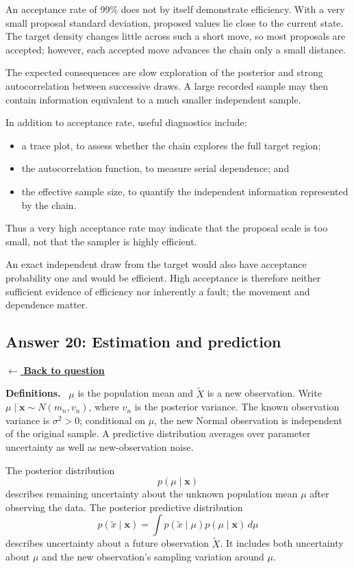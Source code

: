 \documentclass[11pt,a4paper]{article}
\newcommand{\given}{\mathrel{|}}
\newcommand{\xvec}{\boldsymbol{x}}
\newcommand{\answernav}[1]{%
  \label{answer:#1}%
  \noindent\hyperref[question:#1]{$\leftarrow$ \textbf{Back to question}}%
  \par\smallskip}
\newcommand{\studyheading}[1]{%
  \par\medskip\noindent\textcolor{statblue}{\textbf{#1.}}\ }
\begin{document}
An acceptance rate of 99\% does not by itself demonstrate efficiency. With a
very small proposal standard deviation, proposed values lie close to the
current state. The target density changes little across such a short move, so
most proposals are accepted; however, each accepted move advances the chain
only a small distance.

The expected consequences are slow exploration of the posterior and strong
autocorrelation between successive draws. A large recorded sample may then
contain information equivalent to a much smaller independent sample.

In addition to acceptance rate, useful diagnostics include:
\begin{itemize}
  \item a trace plot, to assess whether the chain explores the full target
        region;
  \item the autocorrelation function, to measure serial dependence; and
  \item the effective sample size, to quantify the independent information
        represented by the chain.
\end{itemize}
Thus a very high acceptance rate may indicate that the proposal scale is too
small, not that the sampler is highly efficient.

An exact independent draw from the target would also have acceptance probability one and would be efficient. High acceptance is therefore neither sufficient evidence of efficiency nor inherently a fault; the movement and dependence matter.

\clearpage

\subsection{Answer 20: Estimation and prediction}
\answernav{20}

\studyheading{Definitions}
$\mu$ is the population mean and $\widetilde X$ is a new observation.
Write $\mu\given\xvec\sim N(m_n,v_n)$, where $v_n$ is the posterior variance.
The known observation variance is $\sigma^2>0$; conditional on $\mu$, the new Normal observation is independent of the original sample.
A predictive distribution averages over parameter uncertainty as well as new-observation noise.

The posterior distribution
\[
p(\mu\mid\xvec)
\]
describes remaining uncertainty about the unknown population mean $\mu$ after
observing the data. The posterior predictive distribution
\[
p(\widetilde x\mid\xvec)
=\int p(\widetilde x\mid\mu)
p(\mu\mid\xvec)\,d\mu
\]
describes uncertainty about a future observation $\widetilde X$. It includes
both uncertainty about $\mu$ and the new observation's sampling variation
around $\mu$.
\end{document}
